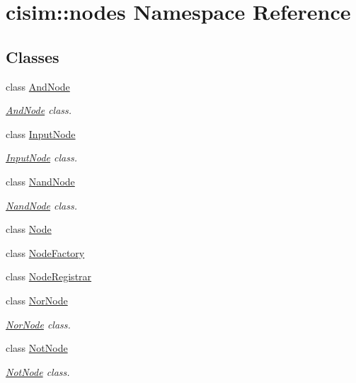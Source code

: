 \hypertarget{namespacecisim_1_1nodes}{}\section{cisim\+:\+:nodes Namespace Reference}
\label{namespacecisim_1_1nodes}
\subsection*{Classes}
\begin{DoxyCompactItemize}
\item 
class \hyperlink{classcisim_1_1nodes_1_1_and_node}{And\+Node}
\begin{DoxyCompactList}\small\item\em \hyperlink{classcisim_1_1nodes_1_1_and_node}{And\+Node} class. \end{DoxyCompactList}\item 
class \hyperlink{classcisim_1_1nodes_1_1_input_node}{Input\+Node}
\begin{DoxyCompactList}\small\item\em \hyperlink{classcisim_1_1nodes_1_1_input_node}{Input\+Node} class. \end{DoxyCompactList}\item 
class \hyperlink{classcisim_1_1nodes_1_1_nand_node}{Nand\+Node}
\begin{DoxyCompactList}\small\item\em \hyperlink{classcisim_1_1nodes_1_1_nand_node}{Nand\+Node} class. \end{DoxyCompactList}\item 
class \hyperlink{classcisim_1_1nodes_1_1_node}{Node}
\item 
class \hyperlink{classcisim_1_1nodes_1_1_node_factory}{Node\+Factory}
\item 
class \hyperlink{classcisim_1_1nodes_1_1_node_registrar}{Node\+Registrar}
\item 
class \hyperlink{classcisim_1_1nodes_1_1_nor_node}{Nor\+Node}
\begin{DoxyCompactList}\small\item\em \hyperlink{classcisim_1_1nodes_1_1_nor_node}{Nor\+Node} class. \end{DoxyCompactList}\item 
class \hyperlink{classcisim_1_1nodes_1_1_not_node}{Not\+Node}
\begin{DoxyCompactList}\small\item\em \hyperlink{classcisim_1_1nodes_1_1_not_node}{Not\+Node} class. \end{DoxyCompactList}\item 

\end{DoxyCompactItemize}
